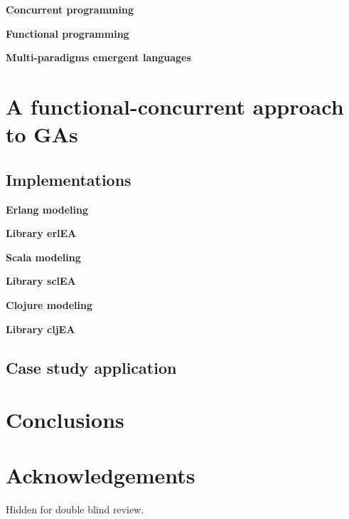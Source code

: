 \documentclass[a4paper]{llncs}
\newcommand{\simpleEntry}[1]
{
\vspace{.3cm}
\noindent \textbf{#1}
\vspace{.3cm}
}
\begin{document}
\simpleEntry{Concurrent programming}
    

\simpleEntry{Functional programming}
    

\simpleEntry{Multi-paradigms emergent languages}
    

\section{A functional-concurrent approach to GAs}
\label{sec:design}
    

\subsection{Implementations}
\label{sec:impl}
    

\simpleEntry{Erlang modeling}
    

\simpleEntry{Library erlEA}
    

\simpleEntry{Scala modeling}
    

\simpleEntry{Library sclEA}
    

\simpleEntry{Clojure modeling}
    

\simpleEntry{Library cljEA}
    

\subsection{Case study application}
    

\section{Conclusions}
\label{sec:conclusions}
    


\section{Acknowledgements}

Hidden for double blind review.
%




\end{document}

